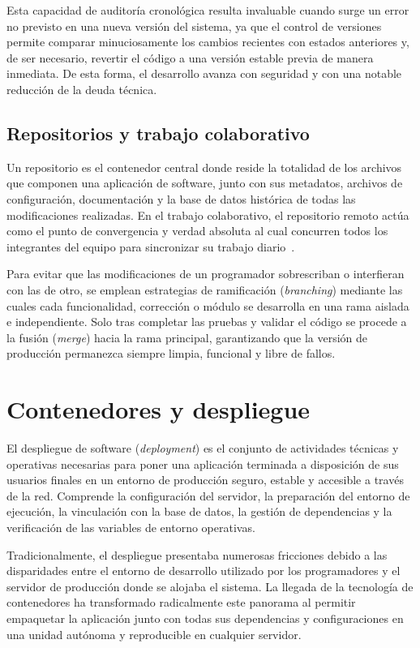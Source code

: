 Esta capacidad de auditoría cronológica resulta invaluable cuando surge un error no previsto en una nueva versión del sistema, ya que el control de versiones permite comparar minuciosamente los cambios recientes con estados anteriores y, de ser necesario, revertir el código a una versión estable previa de manera inmediata. De esta forma, el desarrollo avanza con seguridad y con una notable reducción de la deuda técnica.

\subsection{Repositorios y trabajo colaborativo}

Un repositorio es el contenedor central donde reside la totalidad de los archivos que componen una aplicación de software, junto con sus metadatos, archivos de configuración, documentación y la base de datos histórica de todas las modificaciones realizadas. En el trabajo colaborativo, el repositorio remoto actúa como el punto de convergencia y verdad absoluta al cual concurren todos los integrantes del equipo para sincronizar su trabajo diario~\cite{git_doc, github_repos}.

Para evitar que las modificaciones de un programador sobrescriban o interfieran con las de otro, se emplean estrategias de ramificación (\textit{branching}) mediante las cuales cada funcionalidad, corrección o módulo se desarrolla en una rama aislada e independiente. Solo tras completar las pruebas y validar el código se procede a la fusión (\textit{merge}) hacia la rama principal, garantizando que la versión de producción permanezca siempre limpia, funcional y libre de fallos.

\section{Contenedores y despliegue}

El despliegue de software (\textit{deployment}) es el conjunto de actividades técnicas y operativas necesarias para poner una aplicación terminada a disposición de sus usuarios finales en un entorno de producción seguro, estable y accesible a través de la red. Comprende la configuración del servidor, la preparación del entorno de ejecución, la vinculación con la base de datos, la gestión de dependencias y la verificación de las variables de entorno operativas.

Tradicionalmente, el despliegue presentaba numerosas fricciones debido a las disparidades entre el entorno de desarrollo utilizado por los programadores y el servidor de producción donde se alojaba el sistema. La llegada de la tecnología de contenedores ha transformado radicalmente este panorama al permitir empaquetar la aplicación junto con todas sus dependencias y configuraciones en una unidad autónoma y reproducible en cualquier servidor.

